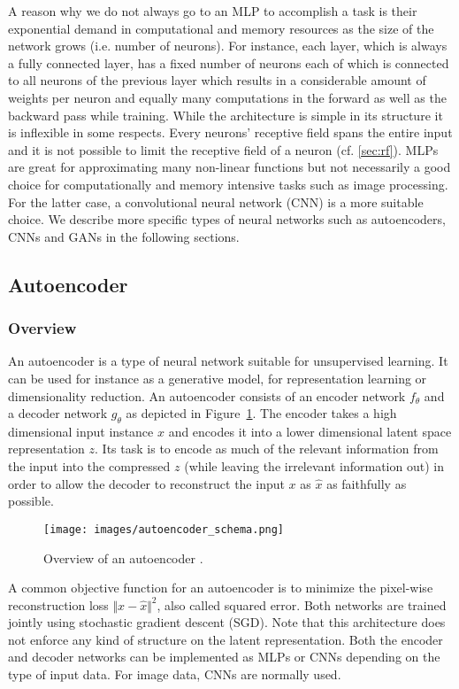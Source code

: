 \documentclass[12pt,a4paper]{article}
\begin{document}
A reason why we do not always go to an MLP to accomplish a task is their exponential demand in computational and memory resources as the size of the network grows (i.e. number of neurons). For instance, each layer, which is always a fully connected layer, has a fixed number of neurons each of which is connected to all neurons of the previous layer which results in a considerable amount of weights per neuron and equally many computations in the forward as well as the backward pass while training. While the architecture is simple in its structure it is inflexible in some respects. Every neurons' receptive field spans the entire input and it is not possible to limit the receptive field of a neuron (cf. \ref{sec:rf}). MLPs are great for approximating many non-linear functions but not necessarily a good choice for computationally and memory intensive tasks such as image processing. For the latter case, a convolutional neural network (CNN) is a more suitable choice. We describe more specific types of neural networks such as autoencoders, CNNs and GANs in the following sections.


\subsection{Autoencoder}
\subsubsection{Overview}
An autoencoder is a type of neural network suitable for unsupervised learning. It can be used for instance as a generative model, for representation learning or dimensionality reduction. An autoencoder consists of an encoder network $f_{\theta}$ and a decoder network  $g_{\theta}$ as depicted in Figure~\ref{fig:autoencoder}. The encoder takes a high dimensional input instance $x$ and encodes it into a lower dimensional latent space representation $z$. Its task is to encode as much of the relevant information from the input into the compressed $z$ (while leaving the irrelevant information out) in order to allow the decoder to reconstruct the input $x$ as $\hat{x}$ as faithfully as possible.
\begin{figure}[ht]
\centering
\texttt{[image: images/autoencoder\_schema.png]}
\caption{Overview of an autoencoder \cite{chollet_autoencoders}.}
\label{fig:autoencoder}
\end{figure}
A common objective function for an autoencoder is to minimize the pixel-wise reconstruction loss $\Vert x - \hat{x} \Vert^2$, also called squared error. Both networks are trained jointly using stochastic gradient descent (SGD). Note that this architecture does not enforce any kind of structure on the latent representation. Both the encoder and decoder networks can be implemented as MLPs or CNNs depending on the type of input data. For image data, CNNs are normally used.
\end{document}
